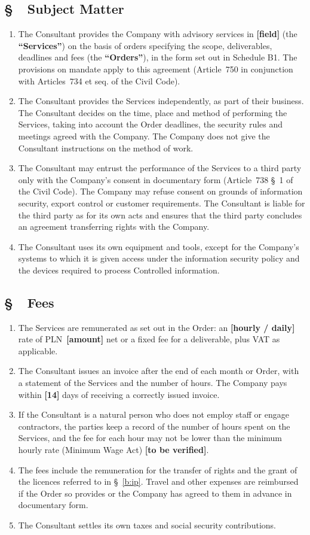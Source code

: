 \documentclass[11pt,a4paper]{report}
\newcounter{paragraf}
\newcommand{\paragraf}[1]{%
  \refstepcounter{paragraf}%
  \Needspace{5\baselineskip}%
  \subsection*{\S~\theparagraf\ #1}%
}
\newenvironment{ContractClause}[1]{\paragraf{#1}}{\par}
\newcommand{\field}[1]{\textbf{[#1]}}
\begin{document}
\begin{ContractClause}{Subject Matter}
\begin{enumerate}
  \item The Consultant provides the Company with advisory services in \field{field} (the \textbf{``Services''}) on the basis of orders specifying the scope, deliverables, deadlines and fees (the \textbf{``Orders''}), in the form set out in Schedule B1. The provisions on mandate apply to this agreement (Article~750 in conjunction with Articles~734 et seq. of the Civil Code).
  \item The Consultant provides the Services independently, as part of their business. The Consultant decides on the time, place and method of performing the Services, taking into account the Order deadlines, the security rules and meetings agreed with the Company. The Company does not give the Consultant instructions on the method of work.
  \item The Consultant may entrust the performance of the Services to a third party only with the Company's consent in documentary form (Article~738 \S~1 of the Civil Code). The Company may refuse consent on grounds of information security, export control or customer requirements. The Consultant is liable for the third party as for its own acts and ensures that the third party concludes an agreement transferring rights with the Company.
  \item The Consultant uses its own equipment and tools, except for the Company's systems to which it is given access under the information security policy and the devices required to process Controlled information.
\end{enumerate}
\end{ContractClause}

\begin{ContractClause}{Fees}
\begin{enumerate}
  \item The Services are remunerated as set out in the Order: an \field{hourly / daily} rate of PLN~\field{amount} net or a fixed fee for a deliverable, plus VAT as applicable.
  \item The Consultant issues an invoice after the end of each month or Order, with a statement of the Services and the number of hours. The Company pays within \field{14} days of receiving a correctly issued invoice.
  \item If the Consultant is a natural person who does not employ staff or engage contractors, the parties keep a record of the number of hours spent on the Services, and the fee for each hour may not be lower than the minimum hourly rate (Minimum Wage Act) \field{to be verified}.
  \item The fees include the remuneration for the transfer of rights and the grant of the licences referred to in \S~\ref{b:ip}. Travel and other expenses are reimbursed if the Order so provides or the Company has agreed to them in advance in documentary form.
  \item The Consultant settles its own taxes and social security contributions.
\end{enumerate}
\end{ContractClause}
\end{document}

